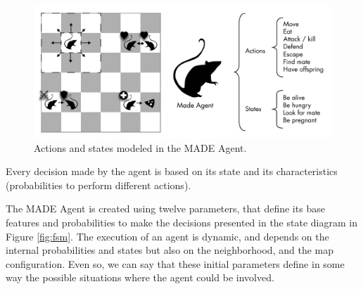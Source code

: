 \documentclass[letterpaper]{article}
\begin{document}
\begin{figure}
\begin{center}
\includegraphics[scale=0.35]{img/MadeAgent.pdf}
\caption{Actions and states modeled in the MADE Agent.}
\label{fig:madeAgent}
\end{center}
\end{figure}




Every
decision made by the agent is based on its state and its
characteristics (probabilities to perform different actions). 





The MADE Agent is created using twelve parameters, that define its
base features and probabilities to make the decisions presented in the
state diagram in Figure \ref{fig:fsm}. The execution of an
agent is dynamic, and depends on the internal probabilities and states
but also on the neighborhood, and the map configuration. Even so, we
can say that these initial parameters define in some way the possible
situations where the agent could be involved.
\end{document}
